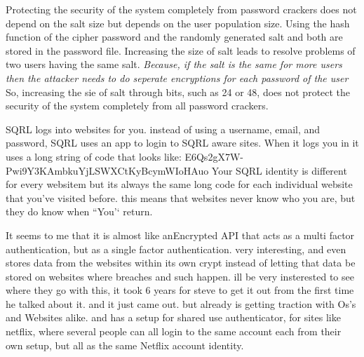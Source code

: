 \documentclass[../CIT288SecurityResearchNotebook.tex]{subfiles}
\begin{document}

Protecting the security of the system completely from password crackers does not depend
on the salt size but depends on the user population size. Using the hash function of
the cipher password and the randomly generated salt and both are stored in the password
file. Increasing the size of salt leads to resolve problems of two users having the
same salt. {\emph{Because, if the salt is the same for more users then the attacker
needs to do seperate encryptions for each password of the user}} So, increasing the sie
of salt through bits, such as 24 or 48, does not protect the security of the system
completely from all password crackers.


SQRL logs into websites for you. instead of using a username, email, and password, SQRL
uses an app to login to SQRL aware sites. When it logs you in it uses a long string of
code that looks like: E6Qs2gX7W-Pwi9Y3KAmbkuYjLSWXCtKyBcymWIoHAuo
\hfill \break
Your SQRL identity is different for every websitem but its always the same long code
for each individual website that you've visited before. this means that websites never
know who you are, but they do know when ``You'` return.

It seems to me that it is almost like anEncrypted API that acts as a multi factor
authentication, but as a single factor authentication. very interesting, and even
stores data from the websites within its own crypt instead of letting that data be
stored on websites where breaches and such happen. ill be very insterested to see where
they go with this, it took 6 years for steve to get it out from the first time he
talked about it. and it just came out. but already is getting traction with Os's and
Websites alike. and has a setup for shared use authenticator, for sites like netflix,
where several people can all login to the same account each from their own setup, but
all as the same Netflix account identity.
\end{document}
